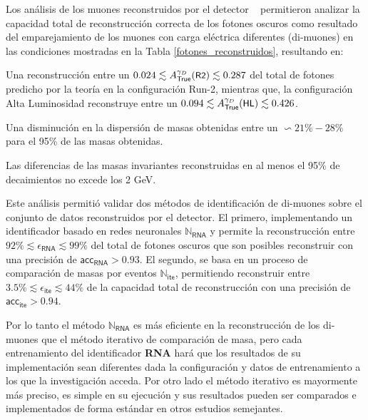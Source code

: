 Los análisis de los muones reconstruidos por el detector \CMS ~ permitieron analizar la capacidad total de reconstrucción correcta de los fotones oscuros como resultado del emparejamiento de los muones con carga eléctrica diferentes (di-muones) en las condiciones mostradas en la Tabla \ref{fotones_reconstruidos}, resultando en:
\begin{itemize_f}
\item Una reconstrucción entre un $0.024\lesssim  A_\textsf{True}^{\gamma_D} (\textsf{\small R2})\lesssim 0.287$ del total de fotones predicho por la teoría en la configuración Run-2, mientras que, la configuración Alta Luminosidad reconstruye entre un $0.094\lesssim A_\textsf{True}^{\gamma_D} (\textsf{\small HL})\lesssim 0.426$.
\item Una disminución en la dispersión de masas obtenidas entre un $\backsim 21\%-28\%$ para el 95\% de las masas obtenidas.


\item Las diferencias de las masas invariantes reconstruidas en al menos el 95\% de decaimientos no excede los 2 GeV.  
\end{itemize_f}
Este análisis permitió validar dos métodos de identificación de di-muones sobre el conjunto de datos reconstruidos por el detector. El primero, implementando un identificador basado en redes neuronales $\mathbb{N}_\textsf{RNA}$ y permite la reconstrucción entre $92\% \lesssim \epsilon_{\textsf{RNA}} \lesssim 99\%$ del total de fotones oscuros que son posibles reconstruir con una precisión de $\textsf{acc}_\textsf{RNA}>0.93$. El segundo, se basa en un proceso de comparación de masas por eventos $\mathbb{N}_\textsf{ite}$, permitiendo reconstruir entre $3.5 \% \lesssim \epsilon_{\textsf{ite}}\lesssim 44\%$ de la capacidad total de reconstrucción con una precisión de $\textsf{acc}_\textsf{ite}>0.94$. 

Por lo tanto el método $\mathbb{N}_\textsf{RNA}$ es más eficiente en la reconstrucción de los di-muones que el método iterativo de comparación de masa, pero cada entrenamiento del identificador \textbf{RNA} hará que los resultados de su implementación sean diferentes dada la configuración y datos de entrenamiento a los que la investigación acceda. Por otro lado el método iterativo es mayormente más preciso, es simple en su ejecución y sus resultados pueden ser comparados e implementados de forma estándar en otros estudios semejantes.




